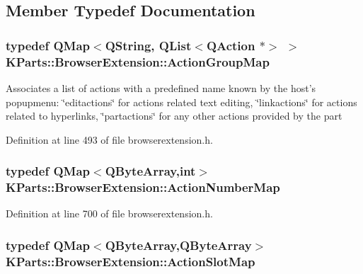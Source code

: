 \subsection{Member Typedef Documentation}
\hypertarget{classKParts_1_1BrowserExtension_a73ab162c395443c0227946524a8ee04c}{
\subsubsection[{Action\+Group\+Map}]{\setlength{\rightskip}{0pt plus 5cm}typedef {\bf Q\+Map}$<$Q\+String, {\bf Q\+List}$<$Q\+Action $\ast$$>$ $>$ {\bf K\+Parts\+::\+Browser\+Extension\+::\+Action\+Group\+Map}}}\label{classKParts_1_1BrowserExtension_a73ab162c395443c0227946524a8ee04c}
Associates a list of actions with a predefined name known by the host's popupmenu\+: \char`\"{}editactions\char`\"{} for actions related text editing, \char`\"{}linkactions\char`\"{} for actions related to hyperlinks, \char`\"{}partactions\char`\"{} for any other actions provided by the part 

Definition at line 493 of file browserextension.\+h.

\hypertarget{classKParts_1_1BrowserExtension_a71369db13dead055035067d4f8ff498d}{
\subsubsection[{Action\+Number\+Map}]{\setlength{\rightskip}{0pt plus 5cm}typedef {\bf Q\+Map}$<$Q\+Byte\+Array,int$>$ {\bf K\+Parts\+::\+Browser\+Extension\+::\+Action\+Number\+Map}}}\label{classKParts_1_1BrowserExtension_a71369db13dead055035067d4f8ff498d}


Definition at line 700 of file browserextension.\+h.

\hypertarget{classKParts_1_1BrowserExtension_ac931bbd8189a4386b609180b5e704344}{
\subsubsection[{Action\+Slot\+Map}]{\setlength{\rightskip}{0pt plus 5cm}typedef {\bf Q\+Map}$<$Q\+Byte\+Array,Q\+Byte\+Array$>$ {\bf K\+Parts\+::\+Browser\+Extension\+::\+Action\+Slot\+Map}}}\label{classKParts_1_1BrowserExtension_ac931bbd8189a4386b609180b5e704344}


